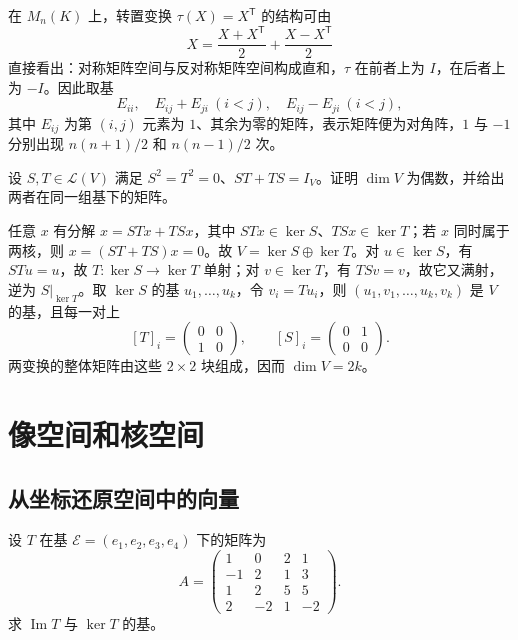 在 $M_n(K)$ 上，转置变换 $\tau(X)=X^{\mathsf T}$ 的结构可由
\[
    X=\frac{X+X^{\mathsf T}}2+\frac{X-X^{\mathsf T}}2
\]
直接看出：对称矩阵空间与反对称矩阵空间构成直和，$\tau$ 在前者上为 $I$，在后者上为 $-I$。因此取基
\[
    E_{ii},\quad E_{ij}+E_{ji}\ (i<j),\quad E_{ij}-E_{ji}\ (i<j),
\]
其中 $E_{ij}$ 为第 $(i,j)$ 元素为 $1$、其余为零的矩阵，表示矩阵便为对角阵，$1$ 与 $-1$ 分别出现 $n(n+1)/2$ 和 $n(n-1)/2$ 次。

\begin{example}
\label{ex:xie-ex-paired-square-zero}
设 $S,T\in\mathcal L(V)$ 满足 $S^2=T^2=0$、$ST+TS=I_V$。证明 $\dim V$ 为偶数，并给出两者在同一组基下的矩阵。
\end{example}

\begin{solve}
任意 $x$ 有分解 $x=STx+TSx$，其中 $STx\in\ker S$、$TSx\in\ker T$；若 $x$ 同时属于两核，则 $x=(ST+TS)x=0$。故 $V=\ker S\oplus\ker T$。对 $u\in\ker S$，有 $STu=u$，故 $T:\ker S\to\ker T$ 单射；对 $v\in\ker T$，有 $TSv=v$，故它又满射，逆为 $S|_{\ker T}$。取 $\ker S$ 的基 $u_1,\ldots,u_k$，令 $v_i=Tu_i$，则 $(u_1,v_1,\ldots,u_k,v_k)$ 是 $V$ 的基，且每一对上
\[
    [T]_i=\begin{pmatrix}0&0\\1&0\end{pmatrix},\qquad
    [S]_i=\begin{pmatrix}0&1\\0&0\end{pmatrix}.
\]
两变换的整体矩阵由这些 $2\times2$ 块组成，因而 $\dim V=2k$。
\end{solve}

\section{像空间和核空间}
\label{sec:xie-ex-images-kernels}

\subsection{从坐标还原空间中的向量}

\begin{example}
\label{ex:xie-ex-compute-image-kernel}
设 $T$ 在基 $\mathcal E=(e_1,e_2,e_3,e_4)$ 下的矩阵为
\[
    A=\begin{pmatrix}
    1&0&2&1\\-1&2&1&3\\1&2&5&5\\2&-2&1&-2
    \end{pmatrix}.
\]
求 $\operatorname{Im}T$ 与 $\ker T$ 的基。
\end{example}

